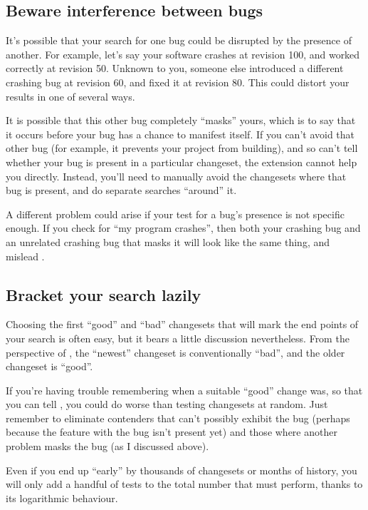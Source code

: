 \subsection{Beware interference between bugs}

It's possible that your search for one bug could be disrupted by the
presence of another.  For example, let's say your software crashes at
revision 100, and worked correctly at revision 50.  Unknown to you,
someone else introduced a different crashing bug at revision 60, and
fixed it at revision 80.  This could distort your results in one of
several ways.

It is possible that this other bug completely ``masks'' yours, which
is to say that it occurs before your bug has a chance to manifest
itself.  If you can't avoid that other bug (for example, it prevents
your project from building), and so can't tell whether your bug is
present in a particular changeset, the  extension cannot
help you directly.  Instead, you'll need to manually avoid the
changesets where that bug is present, and do separate searches
``around'' it.

A different problem could arise if your test for a bug's presence is
not specific enough.  If you check for ``my program crashes'', then
both your crashing bug and an unrelated crashing bug that masks it
will look like the same thing, and mislead .

\subsection{Bracket your search lazily}

Choosing the first ``good'' and ``bad'' changesets that will mark the
end points of your search is often easy, but it bears a little
discussion nevertheless.  From the perspective of , the
``newest'' changeset is conventionally ``bad'', and the older
changeset is ``good''.

If you're having trouble remembering when a suitable ``good'' change
was, so that you can tell , you could do worse than
testing changesets at random.  Just remember to eliminate contenders
that can't possibly exhibit the bug (perhaps because the feature with
the bug isn't present yet) and those where another problem masks the
bug (as I discussed above).

Even if you end up ``early'' by thousands of changesets or months of
history, you will only add a handful of tests to the total number that
 must perform, thanks to its logarithmic behaviour.

